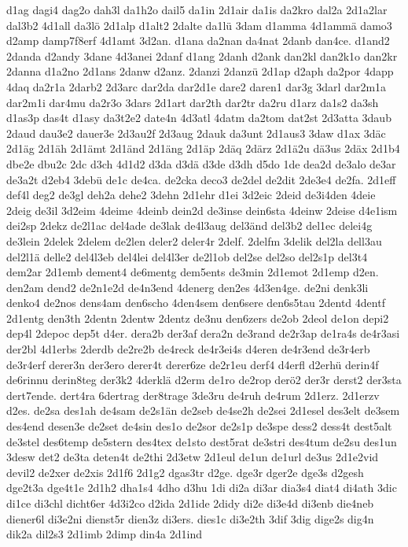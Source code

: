 {d1ag
dagi4
dag2o
dah3l
da1h2o
dail5
da1in
2d1air
da1is
da2kro
dal2a
2d1a2lar
dal3b2
4d1all
da3lö
2d1alp
d1alt2
2dalte
da1lü
3dam
d1amma
4d1ammä
damo3
d2amp
damp7f8erf
4d1amt
3d2an.
d1ana
da2nan
da4nat
2danb
dan4ce.
d1and2
2danda
d2andy
3dane
4d3anei
2danf
d1ang
2danh
d2ank
dan2kl
dan2k1o
dan2kr
2danna
d1a2no
2d1ans
2danw
d2anz.
2danzi
2danzü
2d1ap
d2aph
da2por
4dapp
4daq
da2r1a
2darb2
2d3arc
dar2da
dar2d1e
dare2
daren1
dar3g
3darl
dar2m1a
dar2m1i
dar4mu
da2r3o
3dars
2d1art
dar2th
dar2tr
da2ru
d1arz
da1s2
da3sh
d1as3p
das4t
d1asy
da3t2e2
date4n
4d3atl
4datm
da2tom
dat2st
2d3atta
3daub
2daud
dau3e2
dauer3e
2d3au2f
2d3aug
2dauk
da3unt
2d1aus3
3daw
d1ax
3däc
2d1äg
2d1äh
2d1ämt
2d1änd
2d1äng
2d1äp
2däq
2därz
2d1ä2u
dä3us
2däx
2d1b4
dbe2e
dbu2c
2dc
d3ch
4d1d2
d3da
d3dä
d3de
d3dh
d5do
1de
dea2d
de3alo
de3ar
de3a2t
d2eb4
3debü
de1c
de4ca.
de2cka
deco3
de2del
de2dit
2de3e4
de2fa.
2d1eff
def4l
deg2
de3gl
deh2a
dehe2
3dehn
2d1ehr
d1ei
3d2eic
2deid
de3i4den
4deie
2deig
de3il
3d2eim
4deime
4deinb
dein2d
de3inse
dein6sta
4deinw
2deise
d4e1ism
dei2sp
2dekz
de2l1ac
del4ade
de3lak
de4l3aug
del3änd
del3b2
del1ec
delei4g
de3lein
2delek
2delem
de2len
deler2
deler4r
2delf.
2delfm
3delik
del2la
dell3au
del2l1ä
delle2
del4l3eb
del4lei
del4l3er
de2l1ob
del2se
del2so
del2s1p
del3t4
dem2ar
2d1emb
dement4
de6mentg
dem5ents
de3min
2d1emot
2d1emp
d2en.
den2am
dend2
de2n1e2d
de4n3end
4denerg
den2es
4d3en4ge.
de2ni
denk3li
denko4
de2nos
dens4am
den6scho
4den4sem
den6sere
den6s5tau
2dentd
4dentf
2d1entg
den3th
2dentn
2dentw
2dentz
de3nu
den6zers
de2ob
2deol
de1on
depi2
dep4l
2depoc
dep5t
d4er.
dera2b
der3af
dera2n
de3rand
de2r3ap
de1ra4s
de4r3asi
der2bl
4d1erbs
2derdb
de2re2b
de4reck
de4r3ei4s
d4eren
de4r3end
de3r4erb
de3r4erf
derer3n
der3ero
derer4t
derer6ze
de2r1eu
derf4
d4erfl
d2erhü
derin4f
de6rinnu
derin8teg
der3k2
4derklä
d2erm
de1ro
de2rop
derö2
der3r
derst2
der3sta
dert7ende.
dert4ra
6dertrag
der8trage
3de3ru
de4ruh
de4rum
2d1erz.
2d1erzv
d2es.
de2sa
des1ah
de4sam
de2s1än
de2seb
de4se2h
de2sei
2d1esel
des3elt
de3sem
des4end
desen3e
de2set
de4sin
des1o
de2sor
de2s1p
de3spe
dess2
dess4t
dest5alt
de3stel
des6temp
de5stern
des4tex
de1sto
dest5rat
de3stri
des4tum
de2su
des1un
3desw
det2
de3ta
deten4t
de2thi
2d3etw
2d1eul
de1un
de1url
de3us
2d1e2vid
devil2
de2xer
de2xis
2d1f6
2d1g2
dgas3tr
d2ge.
dge3r
dger2e
dge3s
d2gesh
dge2t3a
dge4t1e
2d1h2
dha1s4
4dho
d3hu
1di
di2a
di3ar
dia3s4
diat4
di4ath
3dic
di1ce
di3chl
dicht6er
4d3i2co
d2ida
2d1ide
2didy
di2e
di3e4d
di3enb
die4neb
diener6l
di3e2ni
dienst5r
dien3z
di3ers.
dies1c
di3e2th
3dif
3dig
dige2s
dig4n
dik2a
dil2s3
2d1imb
2dimp
din4a
2d1ind
}

